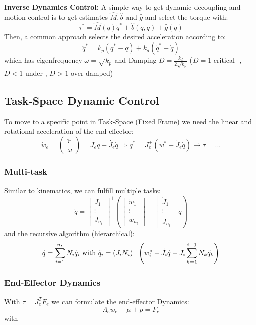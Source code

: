 \documentclass[fontsize=6pt,DIV=calc,a4paper,ngerman]{scrartcl}
\begin{document}
\begin{multicols*}{4}
	\textbf{Inverse Dynamics Control:}
	A simple way to get dynamic decoupling and motion control is to get estimates $\hat{M}, \hat{b}$ and $\hat{g}$ and select the torque with:
	$$\tau^* = \hat{M}(q)\ddot{q}^*+\hat{b}(q,\dot{q})+\hat{g}(q)$$
	Then, a common approach selects the desired acceleration according to:
	$$\ddot{q}^* = k_p(q^*-q)+k_d(\dot{q}^*-\dot{q})$$
	which has eigenfrequency $\omega = \sqrt{k_p}$ and Damping
	$D= \frac{k_d}{2\sqrt{k_p}}$ ($D=1$ critical- , $D<1$ under-, $D>1$ over-damped)

	\subsection{Task-Space Dynamic Control}
	To move to a specific point in Task-Space (Fixed Frame) we need the linear and rotational acceleration of the end-effector:
	$$\dot{w}_e= \begin{pmatrix}\ddot{r}  \\\dot{\omega}\end{pmatrix} = J_e\ddot{q} +\dot{J_e}\dot{q} \Rightarrow \ddot{q}^* = J_e^+\left(w^* - \dot{J}_e \dot{q}\right) \rightarrow \tau = ...$$

	\subsubsection{Multi-task}
	Similar to kinematics, we can fulfill multiple tasks:
	$$\ddot{q}=\begin{bmatrix}J_1 \\ \vdots \\ J_{n_t}\end{bmatrix}^+ \left( \begin{bmatrix}\dot{w}_1 \\ \vdots\\ \dot{w}_{n_t}\end{bmatrix}-\begin{bmatrix}\dot{J}_1 \\ \vdots \\ \dot{J}_{n_t}\end{bmatrix}\dot{q}\right)$$
	and the recursive algorithm (hierarchical):
	$$\dot{q}= \sum_{i=1}^{n_t}\Bar{N}_i\dot{q}_i \text{ with } \ddot{q}_i = (J_i\Bar{N}_i)^+\left( w_i^* -\dot{J_i}\dot{q}- J_i \sum_{k=1}^{i-1}\Bar{N}_k\ddot{q}_k\right)$$

	\subsubsection{End-Effector Dynamics}
	With $\tau = J_e^TF_e$ we can formulate the end-effector Dynamics:
	$$\Lambda_e \dot{w}_e+\mu +p = F_e$$
	with 


\end{multicols*}
\end{document}

